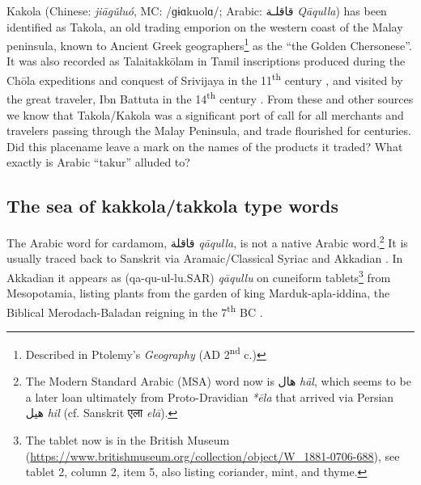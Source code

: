 \documentclass[12pt]{article}
\newcommand{\cu}[1]{\cuneiformfont{#1}\rmfamily}
\newcommand{\tc}[1]{\traditionalchinesefont{#1}\rmfamily}
\begin{document}
Kakola (Chinese: \tc{伽古羅} \textit{jiāgǔluó}, MC: /ɡɨɑkuolɑ/; Arabic: قاقلـة  \textit{Qāqulla}) has been identified as Takola, an old trading emporion on the western coast of the Malay peninsula, known to Ancient Greek geographers\footnote{Described in Ptolemy's \textit{Geography} (AD 2\textsuperscript{nd} c.)} as the ``the Golden Chersonese''. It was also recorded as Talaitakkōlam in Tamil inscriptions produced during the Chōla expeditions and conquest of Srivijaya in the 11\textsuperscript{th} century \parencite[270]{wheatley_1961_golden}, and visited by the great traveler, Ibn Battuta in the 14\textsuperscript{th} century \parencite{dunn_1986_adventures}. From these and other sources we know that Takola/Kakola was a significant port of call for all merchants and travelers passing through the Malay Peninsula, and trade flourished for centuries. Did this placename leave a mark on the names of the products it traded? What exactly is Arabic ``takur'' \textcite{shi_2021_loanwords} alluded to?

\subsection{The sea of kakkola/takkola type words}

The Arabic word for cardamom, قاقلة \textit{qāqulla}, is not a native Arabic word.\footnote{The Modern Standard Arabic (MSA) word now is هال \textit{hāl}, which seems to be a later loan ultimately from Proto-Dravidian \textit{*ēla} \cite{burrow_1984_dravidian} that arrived via Persian هیل \textit{hil} (cf. Sanskrit एला \textit{elā}).} It is usually traced back to Sanskrit via Aramaic/Classical Syriac and Akkadian \parencites[489]{loew_1928_flora}[58]{zimmern_1915_akkadische}. In Akkadian it appears as \cu{𒋡𒄣𒌌𒇻𒊬} (qa-qu-ul-lu.SAR) \textit{qāqullu} on cuneiform tablets\footnote{The tablet now is in the British Museum (\url{https://www.britishmuseum.org/collection/object/W_1881-0706-688}), see tablet 2, column 2, item 5, also listing coriander, mint, and thyme.} from Mesopotamia, listing plants from the garden of king Marduk-apla-iddina, the Biblical Merodach-Baladan reigning in the 7\textsuperscript{th} BC \parencite{ridder_2019_botanical}.


\end{document}

